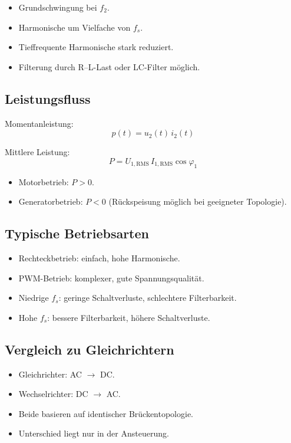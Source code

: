 \begin{itemize}
\item Grundschwingung bei $f_2$.
\item Harmonische um Vielfache von $f_s$.
\item Tieffrequente Harmonische stark reduziert.
\item Filterung durch R--L-Last oder LC-Filter möglich.
\end{itemize}

\subsection{Leistungsfluss}

Momentanleistung:
\[
p(t) = u_2(t)\, i_2(t)
\]

Mittlere Leistung:
\[
\boxed{P = U_{1,\mathrm{RMS}} \, I_{1,\mathrm{RMS}} \cos\varphi_1}
\]

\begin{itemize}
\item Motorbetrieb: $P>0$.
\item Generatorbetrieb: $P<0$ (Rückspeisung möglich bei geeigneter Topologie).
\end{itemize}

\subsection{Typische Betriebsarten}

\begin{itemize}
\item Rechteckbetrieb: einfach, hohe Harmonische.
\item PWM-Betrieb: komplexer, gute Spannungsqualität.
\item Niedrige $f_s$: geringe Schaltverluste, schlechtere Filterbarkeit.
\item Hohe $f_s$: bessere Filterbarkeit, höhere Schaltverluste.
\end{itemize}

\subsection{Vergleich zu Gleichrichtern}

\begin{itemize}
\item Gleichrichter: AC $\rightarrow$ DC.
\item Wechselrichter: DC $\rightarrow$ AC.
\item Beide basieren auf identischer Brückentopologie.
\item Unterschied liegt nur in der Ansteuerung.
\end{itemize}

